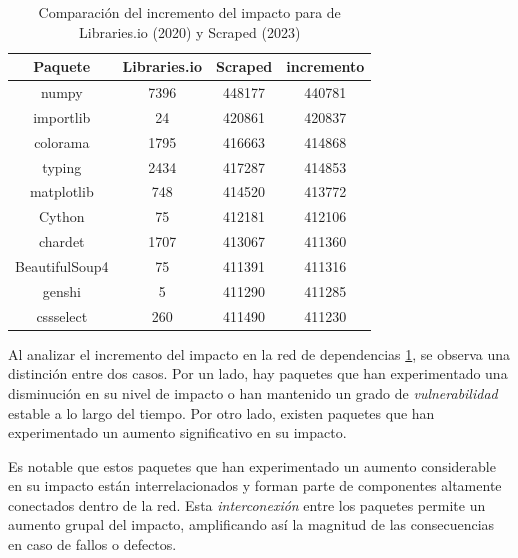 \begin{table}[ht!]
    \centering
    \caption{Comparación del incremento del impacto para de Libraries.io (2020) y Scraped (2023)}
    \begin{tabular}{|c|c|c|c|}
        \hline
        \textbf{Paquete} & \textbf{Libraries.io} & \textbf{Scraped} & \textbf{incremento} \\
        \hline
        numpy            & 7396                  & 448177           & 440781              \\
        importlib        & 24                    & 420861           & 420837              \\
        colorama         & 1795                  & 416663           & 414868              \\
        typing           & 2434                  & 417287           & 414853              \\
        matplotlib       & 748                   & 414520           & 413772              \\
        Cython           & 75                    & 412181           & 412106              \\
        chardet          & 1707                  & 413067           & 411360              \\
        BeautifulSoup4   & 75                    & 411391           & 411316              \\
        genshi           & 5                     & 411290           & 411285              \\
        cssselect        & 260                   & 411490           & 411230              \\
        \hline
    \end{tabular}
    \label{tab:Comparación del incremento del impacto para de Libraries.io (2020) y Scraped (2023)}
\end{table}

Al analizar el incremento del impacto en la red de dependencias \ref{tab:Comparación del incremento del impacto para de Libraries.io (2020) y Scraped (2023)}, se observa una distinción entre
dos casos. Por un lado, hay paquetes que han experimentado una disminución en su nivel de impacto
o han mantenido un grado de \emph{vulnerabilidad} estable a lo largo del tiempo. Por otro lado,
existen paquetes que han experimentado un aumento significativo en su impacto.

Es notable que estos paquetes que han experimentado un aumento considerable en su impacto
están interrelacionados y forman parte de componentes altamente conectados dentro de la red.
Esta \emph{interconexión} entre los paquetes permite un aumento grupal del impacto, amplificando
así la magnitud de las consecuencias en caso de fallos o defectos.


